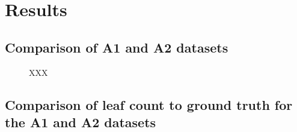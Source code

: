 \documentclass[paper=A4,bibliography=totocnumbered]{scrartcl}
\begin{document}
\section{Results}

\subsection{Comparison of A1 and A2 datasets}
\begin{figure}
	\centering
	\qquad
	\caption{XXX}
	\label{fig:A1-A2-size}
\end{figure}

\subsection{Comparison of leaf count to ground truth for the A1 and A2 datasets}
\end{document}
